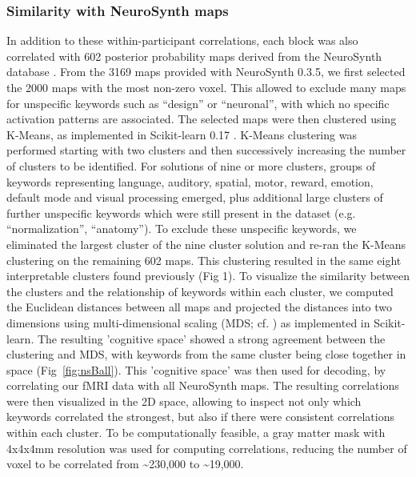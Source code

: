 \documentclass[fleqn,10pt]{SelfArx} %
\begin{document}
\subsubsection*{Similarity with NeuroSynth maps}
In addition to these within-participant correlations, each block was also correlated with 602 posterior probability maps derived from the NeuroSynth database \citep{Yarkoni_2011}. From the 3169 maps provided with NeuroSynth 0.3.5, we first selected the 2000 maps with the most non-zero voxel. This allowed to exclude many maps for unspecific keywords such as “design” or “neuronal”, with which no specific activation patterns are associated. The selected maps were then clustered using K-Means, as implemented in Scikit-learn 0.17 \citep{Pedregosa_2011}. K-Means clustering was performed starting with two clusters and then successively increasing the number of clusters to be identified. For solutions of nine or more clusters, groups of keywords representing language, auditory, spatial, motor, reward, emotion, default mode and visual processing emerged, plus additional large clusters of further unspecific keywords which were still present in the dataset (e.g. “normalization”, “anatomy”). To exclude these unspecific keywords, we eliminated the largest cluster of the nine cluster solution and re-ran the K-Means clustering on the remaining 602 maps. This clustering resulted in the same eight interpretable clusters found previously (Fig 1). To visualize the similarity between the clusters and the relationship of keywords within each cluster, we computed the Euclidean distances between all maps and projected the distances into two dimensions using multi-dimensional scaling (MDS; cf. \citet{Kriegeskorte_2008}) as implemented in Scikit-learn. The resulting 'cognitive space' showed a strong agreement between the clustering and MDS, with keywords from the same cluster being close together in space (Fig~\ref{fig:nsBall}).
This 'cognitive space' was then used for decoding, by correlating our fMRI data with all NeuroSynth maps. The resulting correlations were then visualized in the 2D space, allowing to inspect not only which keywords correlated the strongest, but also if there were consistent correlations within each cluster. To be computationally feasible, a gray matter mask with 4x4x4mm resolution was used for computing correlations, reducing the number of voxel to be correlated from \textasciitilde230,000 to \textasciitilde19,000.
\end{document}
